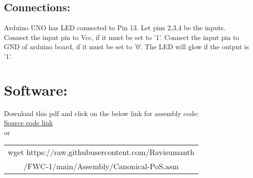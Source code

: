 \documentclass[a4paper,12pt,twocolumn]{article}
\begin{document}
\subsection{Connections:}
Arduino UNO has LED connected to Pin 13. Let pins 2,3,4 be the inputs. Connect the input pin to Vcc, if it must be set to '1'. Connect the input pin to GND of arduino board, if it must be set to '0'. The LED will glow if the output is '1'. 
\section{Software:}
Download this pdf and click on the below link for assembly code:\\
\href{https://raw.githubusercontent.com/Ravisumanth/FWC-1/main/Assembly/Canonical-PoS.asm}{Source code link}\\or\\
\newline \begin{tabular}{|c|}
\hline
wget https://raw.githubusercontent.com/Ravisumanth\\/FWC-1/main/Assembly/Canonical-PoS.asm
\\ \hline
\end{tabular}
\end{document}
